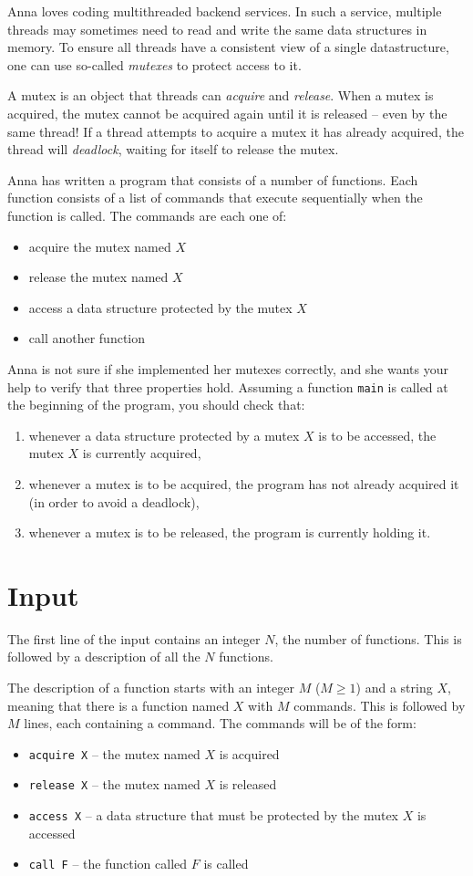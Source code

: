 Anna loves coding multithreaded backend services.
In such a service, multiple threads may sometimes need to read and write the same data structures in memory.
To ensure all threads have a consistent view of a single datastructure, one can use so-called \emph{mutexes} to protect access to it.

A mutex is an object that threads can \emph{acquire} and \emph{release}.
When a mutex is acquired, the mutex cannot be acquired again until it is released -- even by the same thread!
If a thread attempts to acquire a mutex it has already acquired, the thread will \emph{deadlock}, waiting for itself to release the mutex.

Anna has written a program that consists of a number of functions.
Each function consists of a list of commands that execute sequentially when the function is called.
The commands are each one of:
\begin{itemize}
  \item acquire the mutex named $X$
  \item release the mutex named $X$
  \item access a data structure protected by the mutex $X$
  \item call another function
\end{itemize}

Anna is not sure if she implemented her mutexes correctly, and she wants your help to verify that three properties hold.
Assuming a function \texttt{main} is called at the beginning of the program, you should check that:
\begin{enumerate}
  \item whenever a data structure protected by a mutex $X$ is to be accessed, the mutex $X$ is currently acquired,
  \item whenever a mutex is to be acquired, the program has not already acquired it (in order to avoid a deadlock),
  \item whenever a mutex is to be released, the program is currently holding it.
\end{enumerate}

\section*{Input}
The first line of the input contains an integer $N$, the number of functions.
This is followed by a description of all the $N$ functions.

The description of a function starts with an integer $M$ ($M \ge 1$) and a string $X$, meaning that there is a function named $X$ with $M$ commands.
This is followed by $M$ lines, each containing a command.
The commands will be of the form:
\begin{itemize}
  \item \texttt{acquire X} -- the mutex named $X$ is acquired
  \item \texttt{release X} -- the mutex named $X$ is released
  \item \texttt{access X} -- a data structure that must be protected by the mutex $X$ is accessed
  \item \texttt{call F} -- the function called $F$ is called
\end{itemize}

